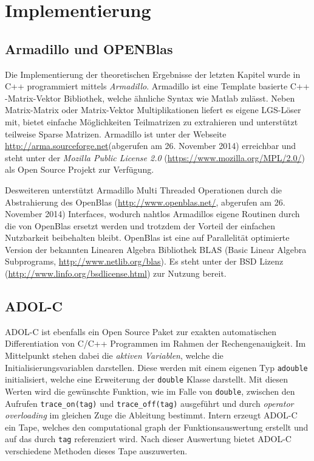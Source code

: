 \chapter{Implementierung}
\section{Armadillo und OPENBlas}
Die Implementierung der theoretischen Ergebnisse der letzten Kapitel wurde in C++ programmiert mittels \textit{Armadillo}. 
Armadillo ist eine Template basierte C++ -Matrix-Vektor Bibliothek, welche ähnliche Syntax wie Matlab zulässt. Neben Matrix-Matrix oder Matrix-Vektor Multiplikationen liefert es eigene LGS-Löser mit, bietet einfache Möglichkeiten Teilmatrizen zu extrahieren und unterstützt teilweise Sparse Matrizen. Armadillo ist unter der Webseite \url{http://arma.sourceforge.net}(abgerufen am 26. November 2014) erreichbar und steht unter der \textit{Mozilla Public License 2.0} (\url{https://www.mozilla.org/MPL/2.0/}) als Open Source Projekt zur Verfügung.

Desweiteren unterstützt Armadillo Multi Threaded Operationen durch die Abstrahierung des OpenBlas (\url{http://www.openblas.net/}, abgerufen am 26. November 2014) Interfaces, wodurch nahtlos Armadillos eigene Routinen durch die von OpenBlas ersetzt werden und trotzdem der Vorteil der einfachen Nutzbarkeit beibehalten bleibt. OpenBlas ist eine auf Parallelität optimierte Version der bekannten Linearen Algebra Bibliothek BLAS (Basic Linear Algebra Subprograms, \url{http://www.netlib.org/blas}). Es steht unter der BSD Lizenz (\url{http://www.linfo.org/bsdlicense.html}) zur Nutzung bereit.

\section{ADOL-C}
ADOL-C ist ebenfalls ein Open Source Paket zur exakten automatischen Differentiation von C/C++ Programmen im Rahmen der Rechengenauigkeit. Im Mittelpunkt stehen dabei die \textit{aktiven Variablen}, welche die Initialisierungsvariablen darstellen. Diese werden mit einem eigenen Typ \texttt{adouble} initialisiert, welche eine Erweiterung der \texttt{double} Klasse darstellt. Mit diesen Werten wird die gewünschte Funktion, wie im Falle von \texttt{double}, zwischen den Aufrufen \texttt{trace\_on(tag)} und \texttt{trace\_off(tag)} ausgeführt und durch \textit{operator overloading} im gleichen Zuge die Ableitung bestimmt. Intern erzeugt ADOL-C ein Tape, welches den computational graph der Funktionsauswertung erstellt und auf das durch \texttt{tag} referenziert wird. Nach dieser Auswertung bietet ADOL-C verschiedene Methoden dieses Tape auszuwerten.

